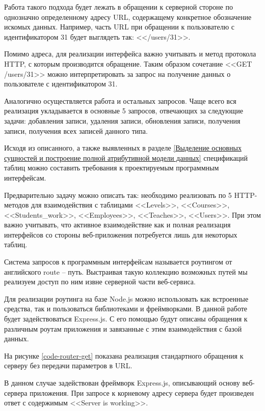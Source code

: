 Работа такого подхода будет лежать в обращении к серверной стороне по однозначно определенному адресу URL, содержащему конкретное обозначение искомых данных.
Например, часть URL при обращении к пользователю с идентификатором 31 будет выглядеть так: <</users/31>>.

Помимо адреса, для реализации интерфейса важно учитывать и метод протокола HTTP, с которым производится обращение.
Таким образом сочетание <<GET /users/31>> можно интерпретировать за запрос на получение данных о пользователе с идентификатором 31.

Аналогично осуществляется работа и остальных запросов.
Чаще всего вся реализация укладывается в основные 5 запросов, отвечающих за следующие задачи: добавления записи, удаления записи, обновления записи, получения записи, получения всех записей данного типа.

Исходя из описанного, а также выявленных в разделе \ref{Выделение основных сущностей и построение полной атрибутивной модели данных} спецификаций таблиц можно составить требования к проектируемым программным интерфейсам.

Предварительно задачу можно описать так: необходимо реализовать по 5 HTTP-методов для взаимодействия с таблицами <<Levels>>, <<Courses>>, <<Students\_work>>, <<Employees>>, <<Teaches>>, <<Users>>.
При этом важно учитывать, что активное взаимодействие как и полная реализация интерфейсов со стороны веб-приложения потребуется лишь для некоторых таблиц.

Система запросов к программным интерфейсам называется роутингом от английского route -- путь.
Выстраивая такую коллекцию возможных путей мы реализуем доступ по ним извне серверной части веб-сервиса.

Для реализации роутинга на базе Node.js можно использовать как встроенные средства, так и пользоваться библиотеками и фреймворками.
В данной работе будет задействоваться Express.js.
С его помощью будут описаны обращения к различным роутам приложения и завязанные с этим взаимодействия с базой данных.

На рисунке \ref{code-router-get} показана реализация стандартного обращения к серверу без передачи параметров в URL.


В данном случае задействован фреймворк Express.js, описывающий основу веб-сервера приложения.
При запросе к корневому адресу сервера будет произведен ответ с содержимым <<Server is working>>.

